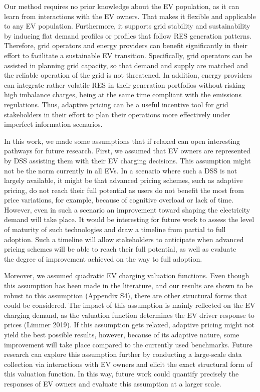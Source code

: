 \documentclass[10pt]{article}
\begin{document}
Our method requires no prior knowledge about the EV population, as it can learn from interactions with the EV owners. That makes it flexible and applicable to any EV population. Furthermore, it supports grid stability and sustainability by inducing flat demand profiles or profiles that follow RES generation patterns. Therefore, grid operators and energy providers can benefit significantly in their effort to facilitate a sustainable EV transition. Specifically, grid operators can be assisted in planning grid capacity, so that demand and supply are matched and the reliable operation of the grid is not threatened. In addition, energy providers can integrate rather volatile RES in their generation portfolios without risking high imbalance charges, being at the same time compliant with the emissions regulations. Thus, adaptive pricing can be a useful incentive tool for grid stakeholders in their effort to plan their operations more effectively under imperfect information scenarios.

In this work, we made some assumptions that if relaxed can open interesting pathways for future research. First, we assumed that EV owners are represented by DSS assisting them with their EV charging decisions. This assumption might not be the norm currently in all EVs. In a scenario where such a DSS is not largely available, it might be that advanced pricing schemes, such as adaptive pricing, do not reach their full potential as users do not benefit the most from price variations, for example, because of cognitive overload or lack of time. However, even in such a scenario an improvement toward shaping the electricity demand will take place. It would be interesting for future work to assess the level of maturity of such technologies and draw a timeline from partial to full adoption. Such a timeline will allow stakeholders to anticipate when advanced pricing schemes will be able to reach their full potential, as well as evaluate\\
the degree of improvement achieved on the way to full adoption.

Moreover, we assumed quadratic EV charging valuation functions. Even though this assumption has been made in the literature, and our results are shown to be robust to this assumption (Appendix S4), there are other structural forms that could be considered. The impact of this assumption is mainly reflected on the EV charging demand, as the valuation function determines the EV driver response to prices (Limmer 2019). If this assumption gets relaxed, adaptive pricing might not yield the best possible results, however, because of its adaptive nature, some improvement will take place compared to the currently used benchmarks. Future research can explore this assumption further by conducting a large-scale data collection via interactions with EV owners and elicit the exact structural form of this valuation function. In this way, future work could quantify precisely the responses of EV owners and evaluate this assumption at a larger scale.
\end{document}
